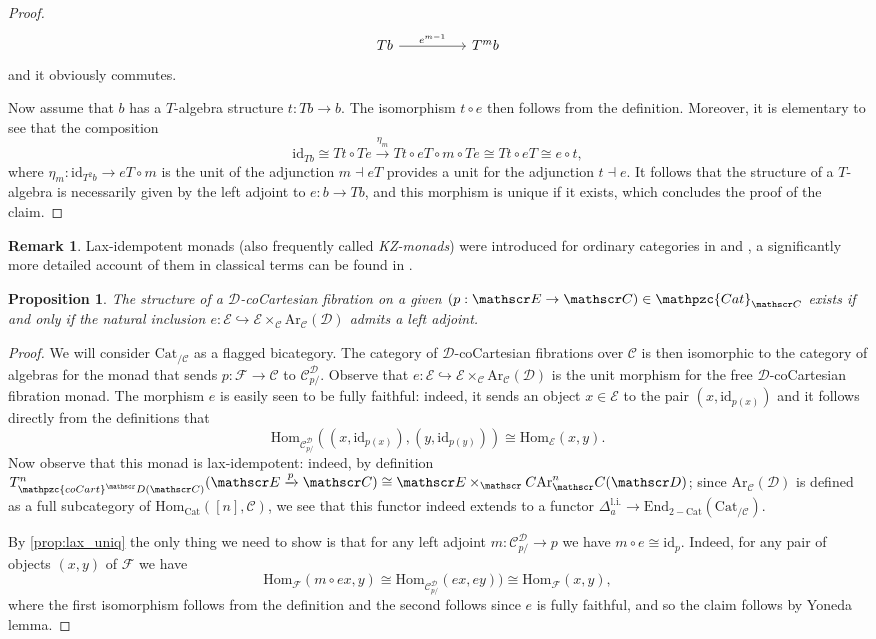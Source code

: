 \documentclass[a4paper, reqno]{amsart}
\newtheorem{prop}[theorem]{Proposition}
\theoremstyle{definition}
\newtheorem{remark}[theorem]{Remark}
\newcommand\cC{\mathscr C}
\newcommand\cD{\mathscr D}
\newcommand\cE{\mathscr E}
\newcommand\cF{\mathscr F}
\newcommand\edm{\mathrm{End}}
\newcommand\id{\mathrm{id}}
\newcommand\mor{\mathrm{Hom}}
\newcommand\cat{\mathrm{Cat}}
\newcommand\ccat{\mathpzc{Cat}}
\newcommand\arr{\mathrm{Ar}}
\newcommand\li{\mathrm{l.i.}}
\newcommand\ccart{\mathpzc{coCart}}
\begin{document}
\begin{proof}
\[\begin{tikzcd}[row sep=huge, column sep=huge]
Tb\arrow[r, "e^{m-1}"]&T^m b
\end{tikzcd}
\]
and it obviously commutes.\par
Now assume that $b$ has a $T$-algebra structure $t:Tb\rightarrow b$. The isomorphism $t\circ e$ then follows from the definition. Moreover, it is elementary to see that the composition 
\[\id_{Tb}\cong Tt \circ Te\xrightarrow{\eta_m} Tt\circ eT\circ m\circ Te\cong Tt\circ eT\cong e\circ t,\]
where $\eta_m:\id_{T^2b}\rightarrow eT\circ m$ is the unit of the adjunction $m\dashv eT$ provides a unit for the adjunction $t\dashv e$. It follows that the structure of a $T$-algebra is necessarily given by the left adjoint to $e:b\rightarrow Tb$, and this morphism is unique if it exists, which concludes the proof of the claim.
\end{proof}
\begin{remark}
Lax-idempotent monads (also frequently called \textit{KZ-monads}) were introduced for ordinary categories in \cite{kock1972monads} and \cite{zoberlein1976doctrines}, a significantly more detailed account of them in classical terms can be found in \cite{bunge2006singular}.
\end{remark}
\begin{prop}\label{prop:cart_uniq}
The structure of a $\cD$-coCartesian fibration on a given $(p:\cE\rightarrow\cC)\in\ccat_{\cC}$ exists if and only if the natural inclusion $e:\cE\hookrightarrow \cE\times_{\cC}\arr_\cC(\cD)$ admits a left adjoint.
\end{prop}
\begin{proof}
We will consider $\cat_{/\cC}$ as a flagged bicategory. The category of $\cD$-coCartesian fibrations over $\cC$ is then isomorphic to the category of algebras for the monad that sends $p:\cF\rightarrow\cC$ to $\cC^\cD_{p/}$. Observe that $e:\cE\hookrightarrow \cE\times_{\cC}\arr_\cC(\cD)$ is the unit morphism for the free $\cD$-coCartesian fibration monad. The morphism $e$ is easily seen to be fully faithful: indeed, it sends an object $x\in\cE$ to the pair $(x,\id_{p(x)})$ and it follows directly from the definitions that
\[\mor_{\cC^\cD_{p/}}((x,\id_{p(x)}),(y,\id_{p(y)}))\cong\mor_\cE(x,y).\]
Now observe that this monad is lax-idempotent: indeed, by definition $T^n_{\ccart^\cD(\cC)}(\cE\xrightarrow{p}\cC)\cong\cE\times_\cC \arr^n_\cC(\cD)$; since $\arr_\cC(\cD)$ is defined as a full subcategory of $\mor_\cat([n],\cC)$, we see that this functor indeed extends to a functor $\Delta^\li_a\rightarrow \edm_{2-\cat}(\cat_{/\cC})$.\par
By \cref{prop:lax_uniq} the only thing we need to show is that for  any left adjoint $m:\cC^\cD_{p/}\rightarrow p$ we have $m\circ e\cong\id_p$. Indeed, for any pair of objects $(x,y)$ of $\cF$ we have
\[\mor_{\cF}(m\circ e x,y)\cong\mor_{\cC^\cD_{p/}}(ex,ey))\cong\mor_\cF(x,y),\]
where the first isomorphism follows from the definition and the second follows since $e$ is fully faithful, and so the claim follows by Yoneda lemma.
\end{proof}
\end{document}
